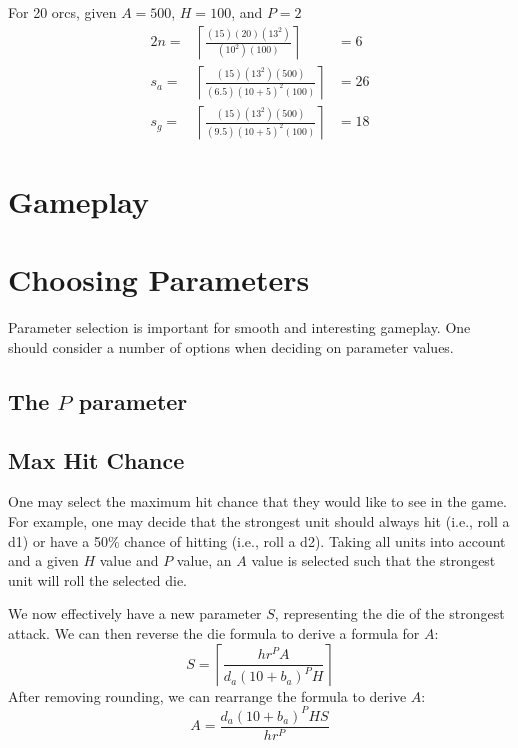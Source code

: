 \documentclass[twocolumn]{article}
\begin{document}
For 20 orcs, given $A = 500$, $H = 100$, and $P = 2$
\begin{alignat*}{2}
    n   =&  
        \left\lceil
            \frac
                {(15) (20) (13^2)}
                {(10^2) (100)}
        \right\rceil
            &=  6
    \\
    s_a =&
        \left\lceil
            \frac
                {(15) (13^2) (500)}
                {(6.5) (10 + 5)^2 (100)}
        \right\rceil
            &=   26 \\
    s_g =&  
        \left\lceil
            \frac
                {(15) (13^2) (500)}
                {(9.5) (10 + 5)^2 (100)}
        \right\rceil
            &=  18
\end{alignat*}


\section{Gameplay}\label{sec:game}

\section{Choosing Parameters}\label{sec:params}

Parameter selection is important for smooth and interesting gameplay.
One should consider a number of options when deciding on parameter values.

\subsection{The $P$ parameter}


\subsection{Max Hit Chance}

One may select the maximum hit chance that they would like to see in the game.
For example, one may decide that the strongest unit should always hit (i.e., roll a d1)
or have a 50\% chance of hitting (i.e., roll a d2).
Taking all units into account and a given $H$ value and $P$ value,
an $A$ value is selected such that the strongest unit will roll the selected die.

We now effectively have a new parameter $S$, representing the die of the strongest attack.
We can then reverse the die formula to derive a formula for $A$:
\[
    S =
        \left\lceil
            \frac
                {h r^P A}
                {d_a (10 + b_{a})^P H}
        \right\rceil
\]
After removing rounding, we can rearrange the formula to derive $A$:
\[
    A = 
        \frac
            {d_a (10 + b_{a})^P H S}
            {h r^P}
\]
\end{document}
